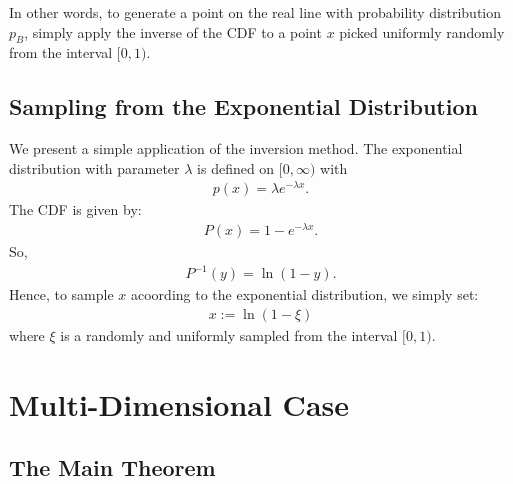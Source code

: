 \documentclass[10pt]{article}
\begin{document}
  In other words, to generate a point on the real line with probability distribution $p_B$, simply apply the inverse of the CDF to a point $x$ picked uniformly randomly from the interval $[0,1)$.

  \subsection{Sampling from the Exponential Distribution}
  We present a simple application of the inversion method.  The exponential distribution with parameter $\lambda$ is defined on $[0,\infty)$ with
  \begin{align*}
    p(x) = \lambda e^{-\lambda x}.
  \end{align*}
  The CDF is given by:
  \begin{align*}
    P(x) = 1 - e^{-\lambda x}.
  \end{align*}
  So,
  \begin{align*}
    P^{-1}(y) = \ln (1 - y).
  \end{align*}
  Hence, to sample $x$ acoording to the exponential distribution, we simply set:
  \begin{align*}
    x := \ln (1 - \xi)
  \end{align*}
  where $\xi$ is a randomly and uniformly sampled from the interval $[0,1)$.

  \section{Multi-Dimensional Case}
  \subsection{The Main Theorem}
\end{document}
